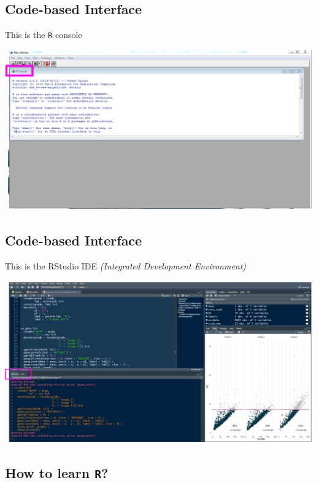 \documentclass[
  letterpaper,
  DIV=11,
  numbers=noendperiod,
  oneside]{scrartcl}
\begin{document}
\hypertarget{code-based-interface}{%
\subsection{Code-based Interface}\label{code-based-interface}}

This is the \texttt{R} console

\includegraphics{./images/console.png}

\hypertarget{code-based-interface-1}{%
\subsection{Code-based Interface}\label{code-based-interface-1}}

This is the RStudio IDE \emph{(Integrated Development Environment)}

\includegraphics{./images/ide.png}

\hypertarget{how-to-learn-r}{%
\subsection{\texorpdfstring{How to learn
\texttt{R}?}{How to learn R?}}\label{how-to-learn-r}}
\end{document}
